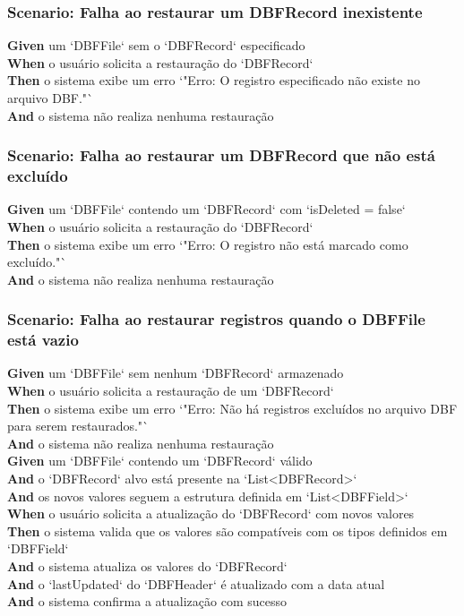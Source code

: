 \subsubsection{Scenario: Falha ao restaurar um DBFRecord inexistente}
\textbf{Given} um `DBFFile` sem o `DBFRecord` especificado \\
\textbf{When} o usuário solicita a restauração do `DBFRecord` \\
\textbf{Then} o sistema exibe um erro `"Erro: O registro especificado não existe no arquivo DBF."` \\
\textbf{And} o sistema não realiza nenhuma restauração

\subsubsection{Scenario: Falha ao restaurar um DBFRecord que não está excluído}
\textbf{Given} um `DBFFile` contendo um `DBFRecord` com `isDeleted = false` \\
\textbf{When} o usuário solicita a restauração do `DBFRecord` \\
\textbf{Then} o sistema exibe um erro `"Erro: O registro não está marcado como excluído."` \\
\textbf{And} o sistema não realiza nenhuma restauração


\subsubsection{Scenario: Falha ao restaurar registros quando o DBFFile está vazio}
\textbf{Given} um `DBFFile` sem nenhum `DBFRecord` armazenado \\
\textbf{When} o usuário solicita a restauração de um `DBFRecord` \\
\textbf{Then} o sistema exibe um erro `"Erro: Não há registros excluídos no arquivo DBF para serem restaurados."` \\
\textbf{And} o sistema não realiza nenhuma restauração \\ 
\textbf{Given} um `DBFFile` contendo um `DBFRecord` válido \\
\textbf{And} o `DBFRecord` alvo está presente na `List<DBFRecord>` \\
\textbf{And} os novos valores seguem a estrutura definida em `List<DBFField>` \\
\textbf{When} o usuário solicita a atualização do `DBFRecord` com novos valores \\
\textbf{Then} o sistema valida que os valores são compatíveis com os tipos definidos em `DBFField` \\
\textbf{And} o sistema atualiza os valores do `DBFRecord` \\
\textbf{And} o `lastUpdated` do `DBFHeader` é atualizado com a data atual \\
\textbf{And} o sistema confirma a atualização com sucesso